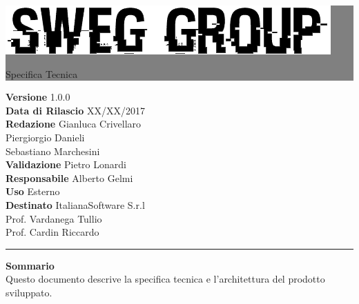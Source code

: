 \documentclass[12pt,a4paper,titlepage]{article}
\newcommand{\HRule}[1]{\hfill \rule{0.2\linewidth}{#1}} %
\begin{document}
	
	\thispagestyle{empty} %
	
	
	\colorbox{grey}{
		\parbox[t]{0.91\linewidth}{
			\centering \fontsize{50pt}{80pt}\selectfont %
			\vspace*{0.7cm} %
			
			\raggedleft
			\includegraphics[width=\linewidth]{../../LogoSWEgGroupSFONDOVUOTO}
			
			\hfill Specifica Tecnica \\
			
			\vspace*{0.7cm} %
		}
	}
	
	
	\vfill %
	
	
	{\centering \large 
		\hfill \textbf{Versione} 			1.0.0 \\		
		\hfill \textbf{Data di Rilascio}	XX/XX/2017 \\ 
		\hfill \textbf{Redazione} 			Gianluca Crivellaro \\
		\hfill								Piergiorgio Danieli \\
		\hfill								Sebastiano Marchesini \\
		\hfill \textbf{Validazione} 		Pietro Lonardi \\
		\hfill \textbf{Responsabile}		Alberto Gelmi \\
		\hfill \textbf{Uso} 				Esterno \\
		\hfill \textbf{Destinato} 			ItalianaSoftware S.r.l \\
		\hfill								Prof. Vardanega Tullio \\ 
		\hfill								Prof. Cardin Riccardo \\
		
		\HRule{1pt}
		
		\textbf{Sommario} \\
		Questo documento descrive la specifica tecnica e l'architettura del prodotto sviluppato.
		
	} %
	
\end{document}
